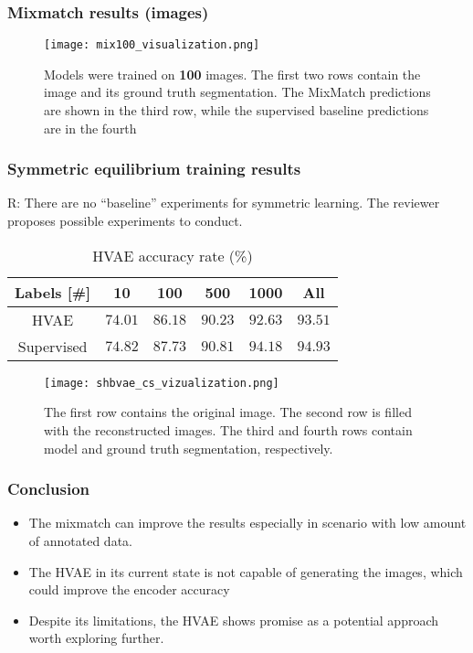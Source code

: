 \documentclass[aspectratio=169,11pt]{beamer}
\begin{document}
\begin{frame}
    \frametitle{Mixmatch results (images)}
    \begin{figure}[t]
        \centering
        \texttt{[image: mix100\_visualization.png]}
        \caption{Models were trained on \textbf{100} images. The first two rows contain the image and its ground truth segmentation. The MixMatch predictions are shown in the third row, 
        while the supervised baseline predictions are in the fourth}
    \end{figure}
\end{frame}

\begin{frame}
    \frametitle{Symmetric equilibrium training results}
    {\footnotesize R: There are no “baseline” experiments for symmetric learning. The reviewer proposes possible experiments to conduct.}
    \begin{table}[tbh]
        \begin{tabular}{|c|c|c|c|c|c|}
        \hline
        Labels [\#]  & 10 & 100 & 500 & 1000 & All \\
        \hline
        HVAE & $74.01$ & $86.18$ & $90.23$ & $92.63$ & $93.51$ \\
        \hline
        Supervised & $74.82$ & $87.73$ & $90.81$ &$94.18$& $94.93$ \\
        \hline
        \end{tabular}
        \caption[HVAE plain accuracy on CityScape]{HVAE accuracy rate (\%) }
        \label{tab:hvae-cityscapes-acc}
    \end{table}
    
    \begin{figure}[t]
        \centering
        \texttt{[image: shbvae\_cs\_vizualization.png]}
        \caption[Symmetric learning HVAE CityScape results]{The first row contains the original image. The second row is filled with the reconstructed
        images. The third and fourth rows contain model and ground truth segmentation, respectively.}
        \label{fig:hvae-cs}
    \end{figure}
\end{frame}

\begin{frame}
    \frametitle{Conclusion}
    \begin{itemize}
        \item The mixmatch can improve the results especially in scenario with low amount of annotated data.
        \item The HVAE in its current state is not capable of generating the images, which could improve the encoder accuracy 
        \item Despite its limitations, the HVAE shows promise as a potential approach worth exploring further.
    
    \end{itemize}
\end{frame}

    
\end{document}
